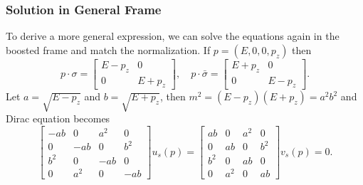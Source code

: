 \subsubsection{Solution in General Frame}
To derive a more general expression, we can solve the equations again in the boosted frame and match the normalization. 
If $p=(E,0,0,p_z)$ then
\begin{equation}
	p \cdot \sigma=\left[\begin{array}{cc}
		E-p_{z} & 0 \\
		0 & E+p_{z}
	\end{array}\right], \quad 
	p \cdot \bar{\sigma}=\left[\begin{array}{cc}
		E+p_{z} & 0 \\
		0 & E-p_{z}
	\end{array}\right].
\end{equation}
Let $a=\sqrt{E-p_{z}}$ and $b=\sqrt{E+p_{z}}$, then $m^{2}=\left(E-p_{z}\right)\left(E+p_{z}\right)=a^{2} b^{2}$ and Dirac equation becomes
\begin{equation}
	\left[\begin{array}{cccc}
		-a b & 0 & a^{2} & 0 \\
		0 & -a b & 0 & b^{2} \\
		b^{2} & 0 & -a b & 0 \\
		0 & a^{2} & 0 & -a b
	\end{array}\right] u_{s}(p) = 
	\left[\begin{array}{cccc}
		a b & 0 & a^{2} & 0 \\
		0 & a b & 0 & b^{2} \\
		b^{2} & 0 & a b & 0 \\
		0 & a^{2} & 0 & a b
	\end{array}\right] v_{s}(p) = 0.
\end{equation}

